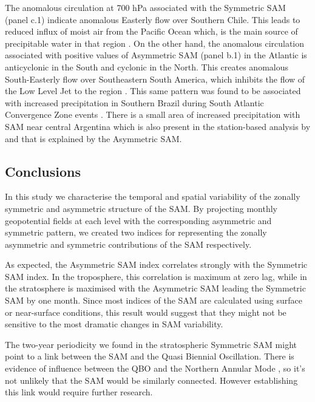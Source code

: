 \documentclass[]{ametsocV5}
\begin{document}
The anomalous circulation at 700 hPa associated with the Symmetric SAM
(panel c.1) indicate anomalous Easterly flow over Southern Chile. This
leads to reduced influx of moist air from the Pacific Ocean which, is
the main source of precipitable water in that region
\citep{garreaud2007}. On the other hand, the anomalous circulation
associated with positive values of Asymmetric SAM (panel b.1) in the
Atlantic is anticyclonic in the South and cyclonic in the North. This
creates anomalous South-Easterly flow over Southeastern South America,
which inhibits the flow of the Low Level Jet to the region
\citep[\citet{zamboni2010}]{silvestri2009}. This same pattern was found
to be associated with increased precipitation in Southern Brazil during
South Atlantic Convergence Zone events \citep{rosso2018}. There is a
small area of increased precipitation with SAM near central Argentina
which is also present in the station-based analysis by
\citet{gillett2006} and that is explained by the Asymmetric SAM.

\subsection{Conclusions}

In this study we characterise the temporal and spatial variability of
the zonally symmetric and asymmetric structure of the SAM. By projecting
monthly geopotential fields at each level with the corresponding
asymmetric and symmetric pattern, we created two indices for
representing the zonally asymmetric and symmetric contributions of the
SAM respectively.

As expected, the Asymmetric SAM index correlates strongly with the
Symmetric SAM index. In the troposphere, this correlation is maximum at
zero lag, while in the stratosphere is maximised with the Asymmetric SAM
leading the Symmetric SAM by one month. Since most indices of the SAM
are calculated using surface or near-surface conditions, this result
would suggest that they might not be sensitive to the most dramatic
changes in SAM variability.

The two-year periodicity we found in the stratospheric Symmetric SAM
might point to a link between the SAM and the Quasi Biennial
Oscillation. There is evidence of influence between the QBO and the
Northern Annular Mode \citep[e.g.][\citet{watson2014},
\citet{zhang2020}]{holton1980}, so it's not unlikely that the SAM would
be similarly connected. However establishing this link would require
further research.
\end{document}
